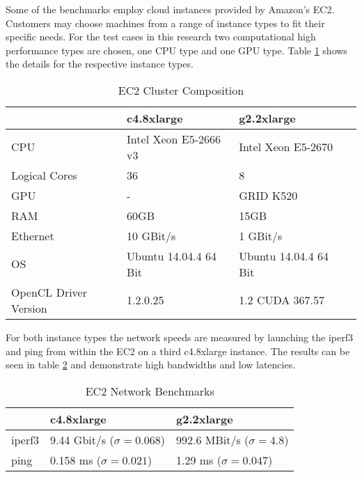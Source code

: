 Some of the benchmarks employ cloud instances provided by Amazon's EC2. Customers may choose machines from a range of instance types to fit their specific needs. For the test cases in this research two computational high performance types are chosen, one CPU type and one GPU type. Table \ref{table:cluster_setup_ec2} shows the details for the respective instance types.

\begin{table}[!htb]
	\centering
	\begin{adjustbox}{width=0.65\textwidth}
		\small
		\begin{tabular}{l | l | l | l}
			~                     & c4.8xlarge                	& g2.2xlarge                 \\
			\hline
			CPU                   &  Intel Xeon E5-2666 v3 	& Intel Xeon E5-2670 \\
			Logical Cores         &  36 	& 8 \\
			GPU                   &  -						& GRID K520 \\
			RAM                   &  60GB                       	& 15GB                       \\
			Ethernet          &  10 GBit/s                  	& 1 GBit/s                  \\
			OS                    &  Ubuntu 14.04.4 64 Bit      	& Ubuntu 14.04.4 64 Bit      \\
			OpenCL Driver Version &  1.2.0.25                   & 1.2 CUDA 367.57        \\
		\end{tabular}
	\end{adjustbox}

	\caption{EC2 Cluster Composition}
	\label{table:cluster_setup_ec2}
\end{table}

For both instance types the network speeds are measured by launching the iperf3 and ping from within the EC2 on a third c4.8xlarge instance. The results can be seen in table \ref{table:cluster_interconnect_benchmarks} and demonstrate high bandwidths and low latencies.

\begin{table}[!htb]
	\centering
	\begin{adjustbox}{width=0.5\textwidth}
		\small
		\begin{tabular}{l | l | l}
			~                     & c4.8xlarge               			& g2.2xlarge                \\
			\hline
			iperf3                & 9.44 Gbit/s ($\sigma = 0.068$) 	& 992.6 MBit/s ($\sigma = 4.8$) \\
			ping                  & 0.158 ms ($\sigma = 0.021$)  		& 1.29 ms ($\sigma = 0.047$)  \\
		\end{tabular}
	\end{adjustbox}

	\caption{EC2 Network Benchmarks}
	\label{table:cluster_interconnect_benchmarks}
\end{table}


